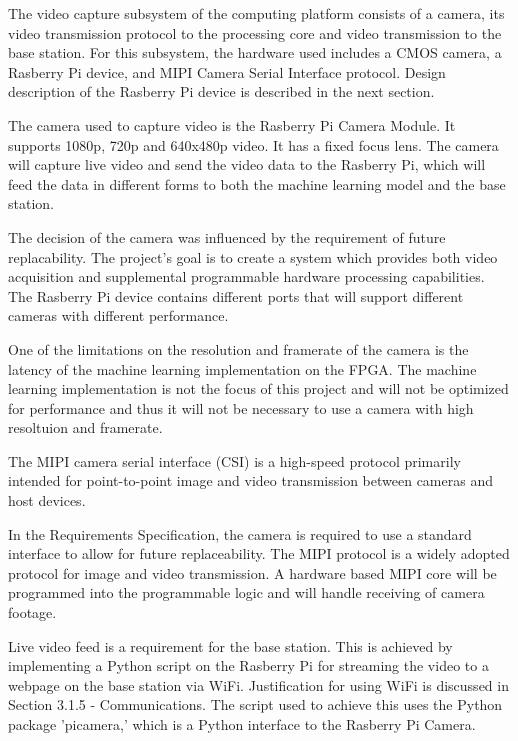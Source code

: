 
The video capture subsystem of the computing platform consists of a camera, its video transmission protocol to the processing core and video transmission to the base station. For this subsystem, the hardware used includes a CMOS camera, a Rasberry Pi device, and MIPI Camera Serial Interface protocol. Design description of the Rasberry Pi device is described in the next section.

The camera used to capture video is the Rasberry Pi Camera Module. It supports 1080p, 720p and 640x480p video. It has a fixed focus lens. The camera will capture live video and send the video data to the Rasberry Pi, which will feed the data in different forms to both the machine learning model and the base station.

The decision of the camera was influenced by the requirement of future replacability. The project's goal is to create a system which provides both video acquisition and supplemental programmable hardware processing capabilities. The Rasberry Pi device contains different ports that will support different cameras with different performance.

One of the limitations on the resolution and framerate of the camera is the latency of the machine learning implementation on the FPGA. The machine learning implementation is not the focus of this project and will not be optimized for performance and thus it will not be necessary to use a camera with high resoltuion and framerate.

The MIPI camera serial interface (CSI) is a high-speed protocol primarily intended for point-to-point image and video transmission between cameras and host devices. 

In the Requirements Specification, the camera is required to use a standard interface to allow for future replaceability. The MIPI protocol is a widely adopted protocol for image and video transmission. A hardware based MIPI core will be programmed into the programmable logic and will handle receiving of camera footage.

Live video feed is a requirement for the base station. This is achieved by implementing a Python script on the Rasberry Pi for streaming the video to a webpage on the base station via WiFi. Justification for using WiFi is discussed in Section 3.1.5 - Communications. The script used to achieve this uses the Python package 'picamera,' which is a Python interface to the Rasberry Pi Camera. 

